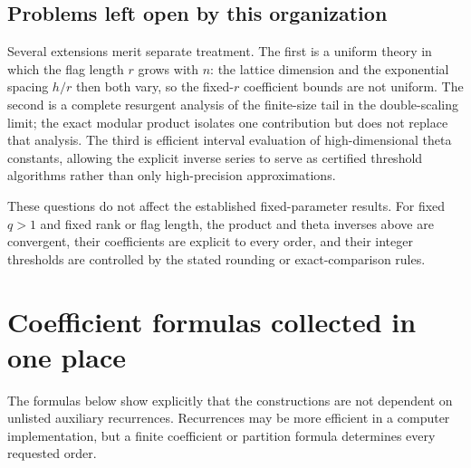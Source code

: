 \documentclass[11pt,openany]{book}
\numberwithin{equation}{chapter}
\theoremstyle{plain}
\theoremstyle{definition}
\theoremstyle{remark}
\begin{document}
\section{Problems left open by this organization}

Several extensions merit separate treatment. The first is a uniform theory in which the flag length $r$ grows with $n$: the lattice dimension and the exponential spacing $h/r$ then both vary, so the fixed-$r$ coefficient bounds are not uniform. The second is a complete resurgent analysis of the finite-size tail in the double-scaling limit; the exact modular product isolates one contribution but does not replace that analysis. The third is efficient interval evaluation of high-dimensional theta constants, allowing the explicit inverse series to serve as certified threshold algorithms rather than only high-precision approximations.

These questions do not affect the established fixed-parameter results. For fixed $q>1$ and fixed rank or flag length, the product and theta inverses above are convergent, their coefficients are explicit to every order, and their integer thresholds are controlled by the stated rounding or exact-comparison rules.

\appendix
\chapter{Coefficient formulas collected in one place}
\label{ct:app:formulas}

\label{t2:app:coefficients}

The formulas below show explicitly that the constructions are not dependent on unlisted auxiliary recurrences. Recurrences may be more efficient in a computer implementation, but a finite coefficient or partition formula determines every requested order.
\end{document}
